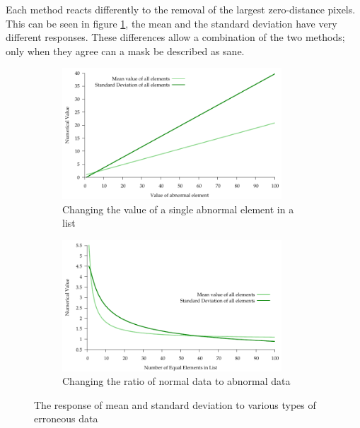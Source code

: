 \documentclass[../main.tex]{subfiles}
\begin{document}
    Each method reacts differently to the removal of the largest zero-distance pixels.
    This can be seen in figure \ref{stddev_image}, the mean and the standard deviation have very different responses.
    These differences allow a combination of the two methods; only when they agree can a mask be described as sane. 
      \begin{figure}[H]
        \centering
        \begin{subfigure}[B]{0.8\textwidth}
          \centering
          \includegraphics[width=0.9\textwidth]{graphs/stddev_great_abnormal}
          \caption{Changing the value of a single abnormal element in a list}
        \end{subfigure}

        \begin{subfigure}[B]{0.8\textwidth}
          \centering
          \includegraphics[width=0.9\textwidth]{graphs/stddev_great_range}
          \caption{Changing the ratio of normal data to abnormal data}
        \end{subfigure}
        \caption[
          Sensitivity of mean and standard to errors
        ]{The response of mean and standard deviation to various types of erroneous data}
        \label{stddev_image}
      \end{figure}
    
\end{document}
